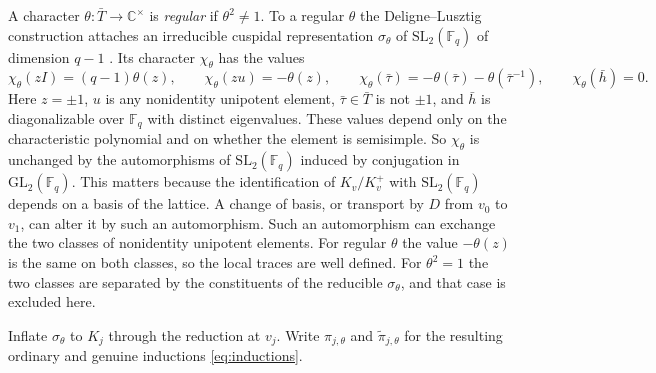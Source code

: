 \documentclass[12pt,letterpaper]{article}
\numberwithin{equation}{section}
\theoremstyle{definition}
\theoremstyle{remark}
\newcommand{\kk}{\mathbb F_q}
\begin{document}
A character $\theta:\bar T\to\mathbb C^\times$ is \emph{regular} if $\theta^2\ne1$. To a regular $\theta$ the Deligne--Lusztig construction attaches an irreducible cuspidal representation $\sigma_\theta$ of $\mathrm{SL}_2(\kk)$ of dimension $q-1$ \cite{DL76,Bo11,DM20}. Its character $\chi_\theta$ has the values
\begin{equation}\label{eq:finite}
 \chi_\theta(zI)=(q-1)\theta(z),\qquad
 \chi_\theta(zu)=-\theta(z),\qquad
 \chi_\theta(\bar\tau)=-\theta(\bar\tau)-\theta(\bar\tau^{-1}),\qquad
 \chi_\theta(\bar h)=0 .
\end{equation}
Here $z=\pm1$, $u$ is any nonidentity unipotent element, $\bar\tau\in\bar T$ is not $\pm1$, and $\bar h$ is diagonalizable over $\kk$ with distinct eigenvalues. These values depend only on the characteristic polynomial and on whether the element is semisimple. So $\chi_\theta$ is unchanged by the automorphisms of $\mathrm{SL}_2(\kk)$ induced by conjugation in $\mathrm{GL}_2(\kk)$. This matters because the identification of $K_v/K_v^+$ with $\mathrm{SL}_2(\kk)$ depends on a basis of the lattice. A change of basis, or transport by $D$ from $v_0$ to $v_1$, can alter it by such an automorphism. Such an automorphism can exchange the two classes of nonidentity unipotent elements. For regular $\theta$ the value $-\theta(z)$ is the same on both classes, so the local traces are well defined. For $\theta^2=1$ the two classes are separated by the constituents of the reducible $\sigma_\theta$, and that case is excluded here.

Inflate $\sigma_\theta$ to $K_j$ through the reduction at $v_j$. Write $\pi_{j,\theta}$ and $\widetilde\pi_{j,\theta}$ for the resulting ordinary and genuine inductions \eqref{eq:inductions}.
\end{document}
